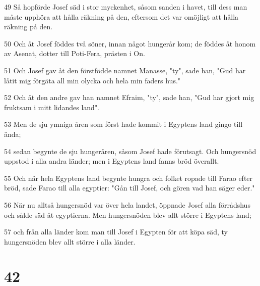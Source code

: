 \par 49 Så hopförde Josef säd i stor myckenhet, såsom sanden i havet, till dess man måste upphöra att hålla räkning på den, eftersom det var omöjligt att hålla räkning på den.
\par 50 Och åt Josef föddes två söner, innan något hungerår kom; de föddes åt honom av Asenat, dotter till Poti-Fera, prästen i On.
\par 51 Och Josef gav åt den förstfödde namnet Manasse, "ty", sade han, "Gud har låtit mig förgäta all min olycka och hela min faders hus."
\par 52 Och åt den andre gav han namnet Efraim, "ty", sade han, "Gud har gjort mig fruktsam i mitt lidandes land".
\par 53 Men de sju ymniga åren som först hade kommit i Egyptens land gingo till ända;
\par 54 sedan begynte de sju hungeråren, såsom Josef hade förutsagt. Och hungersnöd uppstod i alla andra länder; men i Egyptens land fanns bröd överallt.
\par 55 Och när hela Egyptens land begynte hungra och folket ropade till Farao efter bröd, sade Farao till alla egyptier: "Gån till Josef, och gören vad han säger eder."
\par 56 När nu alltså hungersnöd var över hela landet, öppnade Josef alla förrådshus och sålde säd åt egyptierna. Men hungersnöden blev allt större i Egyptens land;
\par 57 och från alla länder kom man till Josef i Egypten för att köpa säd, ty hungersnöden blev allt större i alla länder.

\chapter{42}


